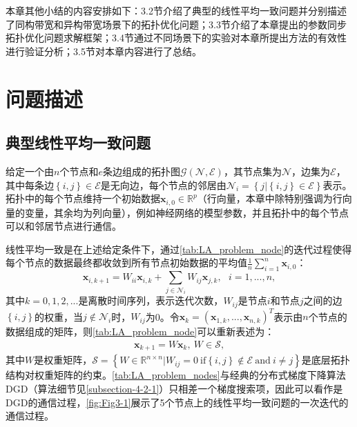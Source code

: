 本章其他小结的内容安排如下：3.2节介绍了典型的线性平均一致问题并分别描述了同构带宽和异构带宽场景下的拓扑优化问题；3.3节介绍了本章提出的参数同步拓扑优化问题求解框架；3.4节通过不同场景下的实验对本章所提出方法的有效性进行验证分析；3.5节对本章内容进行了总结。

\section{问题描述}\label{section3-2}
\subsection{典型线性平均一致问题} \label{section3-2-1}

给定一个由$n$个节点和$e$条边组成的拓扑图$\mathcal{G} \left( \mathcal{N} ,\mathcal{E} \right) $，其节点集为$\mathcal{N}$，边集为$\mathcal{E}$，其中每条边$\left\{ i,j \right\} \in \mathcal{E}$是无向边，每个节点的邻居由$\mathcal{N} _i=\left\{ j|\left\{ i,j \right\} \in \mathcal{E} \right\}$表示。拓扑中的每个节点维持一个初始数据$\boldsymbol{x}_{i,0} \in \mathbb{R}^p$（行向量，本章中除特别强调为行向量的变量，其余均为列向量），例如神经网络的模型参数，并且拓扑中的每个节点可以和邻居节点进行通信。

线性平均一致是在上述给定条件下，通过\autoref{tab:LA_problem_node}的迭代过程使得每个节点的数据最终都收敛到所有节点初始数据的平均值$\frac{1}{n}\sum_{i=1}^n{\boldsymbol{x}_{i,0}}$：
\begin{equation}
    \label{tab:LA_problem_node}
    \boldsymbol{x}_{i,k+1} =W_{ii}\boldsymbol{x}_{i,k} +\sum_{j\in \mathcal{N} _i}{W_{ij}\boldsymbol{x}_{j,k}},\ \ \ i=1,...,n,
\end{equation}
其中$k=0,1,2,...$是离散时间序列，表示迭代次数，$W_{ij}$是节点$i$和节点$j$之间的边$\left\{ i,j \right\}$的权重，当$j\notin \mathcal{N} _i$时，$W_{ij}$为0。令$\boldsymbol{x}_k =\left( \boldsymbol{x}_{1,k} ,...,\boldsymbol{x}_{n,k} \right)^T$表示由$n$个节点的数据组成的矩阵，则\autoref{tab:LA_problem_node}可以重新表述为：
\begin{equation}
    \label{tab:LA_problem_nodes}
    \begin{aligned}
        \boldsymbol{x}_{k+1} =W\boldsymbol{x}_k , \ W\in \mathcal{S},
    \end{aligned}
\end{equation}
其中$W$是权重矩阵，$\mathcal{S} =\left\{ W\in \mathbb{R} ^{n\times n}|W_{ij}=0 \  \mathrm{if} \left\{ i,j \right\} \notin \mathcal{E} \ \mathrm{and} \  i\ne j \right\}$是底层拓扑结构对权重矩阵的约束。\autoref{tab:LA_problem_nodes}与经典的分布式梯度下降算法DGD\cite{nedic2009distributed}（算法细节见\autoref{subsection-4-2-1}）只相差一个梯度搜索项，因此可以看作是DGD的通信过程，\autoref{fig:Fig3-1}展示了5个节点上的线性平均一致问题的一次迭代的通信过程。

